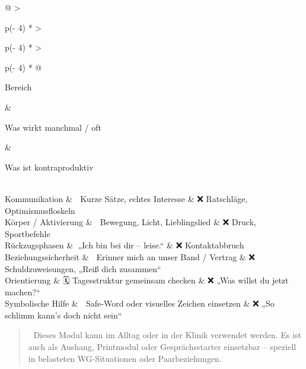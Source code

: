 \begin{longtable}[]{@{}
  >{\raggedright\arraybackslash}p{(\columnwidth - 4\tabcolsep) * }
  >{\raggedright\arraybackslash}p{(\columnwidth - 4\tabcolsep) * }
  >{\raggedright\arraybackslash}p{(\columnwidth - 4\tabcolsep) * }@{}}
\toprule\noalign{}
\begin{minipage}[b]{\linewidth}\raggedright
Bereich
\end{minipage} \& \begin{minipage}[b]{\linewidth}\raggedright
Was wirkt manchmal / oft
\end{minipage} \& \begin{minipage}[b]{\linewidth}\raggedright
Was ist kontraproduktiv
\end{minipage} \\
\midrule\noalign{}
\endhead
\bottomrule\noalign{}
\endlastfoot
Kommunikation \& 💬 Kurze Sätze, echtes Interesse \& ❌ Ratschläge, Optimismusfloskeln \\
Körper / Aktivierung \& 🚶 Bewegung, Licht, Lieblingslied \& ❌ Druck, Sportbefehle \\
Rückzugsphasen \& 🧍„Ich bin bei dir -- leise.`` \& ❌ Kontaktabbruch \\
Beziehungssicherheit \& 🧠 Erinner mich an unser Band / Vertrag \& ❌ Schuldzuweisungen, „Reiß dich zusammen`` \\
Orientierung \& 🗓️ Tagesstruktur gemeinsam checken \& ❌ „Was willst du jetzt machen?{}`` \\
Symbolische Hilfe \& 🔗 Safe-Word oder visuelles Zeichen einsetzen \& ❌ „So schlimm kann's doch nicht sein`` \\
\end{longtable}

\begin{quote}
📎 Dieses Modul kann im Alltag oder in der Klinik verwendet werden. Es ist auch als Aushang, Printmodul oder Gesprächsstarter einsetzbar -- speziell in belasteten WG-Situationen oder Paarbeziehungen.
\end{quote}

